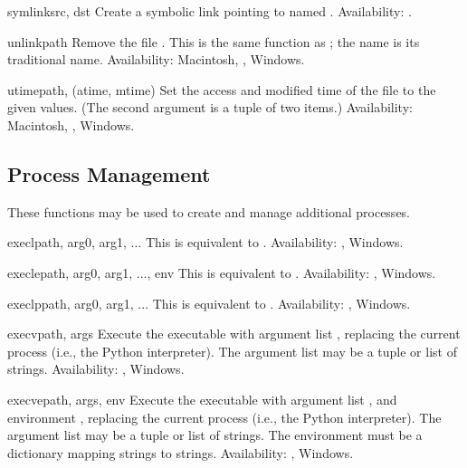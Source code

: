 \begin{funcdesc}{symlink}{src, dst}
Create a symbolic link pointing to  named .
Availability: \UNIX{}.
\end{funcdesc}

\begin{funcdesc}{unlink}{path}
Remove the file .  This is the same function as
; the  name is its traditional
\UNIX{} name.
Availability: Macintosh, \UNIX{}, Windows.
\end{funcdesc}

\begin{funcdesc}{utime}{path, (atime, mtime)}
Set the access and modified time of the file to the given values.
(The second argument is a tuple of two items.)
Availability: Macintosh, \UNIX{}, Windows.
\end{funcdesc}


\subsection{Process Management \label{os-process}}

These functions may be used to create and manage additional
processes.


\begin{funcdesc}{execl}{path, arg0, arg1, ...}
This is equivalent to
.
Availability: \UNIX{}, Windows.
\end{funcdesc}

\begin{funcdesc}{execle}{path, arg0, arg1, ..., env}
This is equivalent to
.
Availability: \UNIX{}, Windows.
\end{funcdesc}

\begin{funcdesc}{execlp}{path, arg0, arg1, ...}
This is equivalent to
.
Availability: \UNIX{}, Windows.
\end{funcdesc}

\begin{funcdesc}{execv}{path, args}
Execute the executable  with argument list ,
replacing the current process (i.e., the Python interpreter).
The argument list may be a tuple or list of strings.
Availability: \UNIX{}, Windows.
\end{funcdesc}

\begin{funcdesc}{execve}{path, args, env}
Execute the executable  with argument list ,
and environment ,
replacing the current process (i.e., the Python interpreter).
The argument list may be a tuple or list of strings.
The environment must be a dictionary mapping strings to strings.
Availability: \UNIX{}, Windows.
\end{funcdesc}

